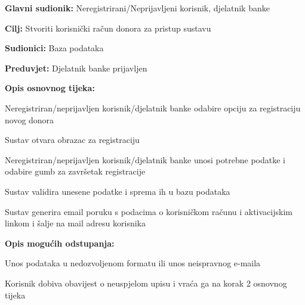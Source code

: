 \noindent {}
					\begin{packed_item}
	
						\item \textbf{Glavni sudionik: }Neregistrirani/Neprijavljeni korisnik, djelatnik banke
						\item \textbf{Cilj:} Stvoriti korisnički račun donora za pristup sustavu
						\item \textbf{Sudionici:} Baza podataka
						\item \textbf{Preduvjet:} Djelatnik banke prijavljen 
						\item \textbf{Opis osnovnog tijeka:}
						
						\item[] \begin{packed_enum}
	
							\item Neregistriran/neprijavljen korisnik/djelatnik banke odabire opciju za registraciju novog donora
							\item Sustav otvara obrazac za registraciju
							\item Neregistriran/neprijavljen korisnik/djelatnik banke unosi potrebne podatke i odabire gumb za završetak registracije
							\item Sustav validira unesene podatke i sprema ih u bazu podataka
							\item Sustav generira email poruku s podacima o korisničkom računu i aktivacijskim linkom i šalje na mail adresu korisnika
							
						\end{packed_enum}
						
						\item  \textbf{Opis mogućih odstupanja:}
						
						\item[] \begin{packed_item}
	
							\item[2.a] Unos podataka u nedozvoljenom formatu ili unos neispravnog e-maila
							\item[] \begin{packed_enum}
								
								\item Korisnik dobiva obavijest o neuspjelom upisu i vraća ga na korak 2 osnovnog tijeka
								
							\end{packed_enum}
							
							
						\end{packed_item}
					\end{packed_item}
